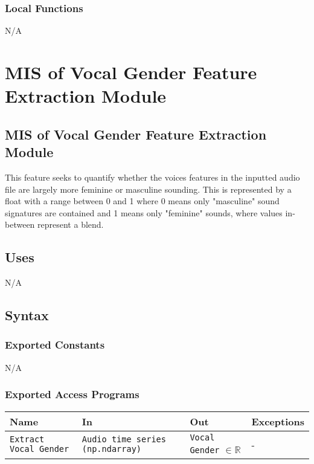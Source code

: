 \documentclass[12pt, titlepage]{article}
\begin{document}
\subsubsection{Local Functions}
N/A


\section{MIS of Vocal Gender Feature Extraction Module} 

\subsection{MIS of Vocal Gender Feature Extraction Module}
This feature seeks to quantify whether the voices features in the inputted audio file 
are largely more feminine or masculine sounding. This is represented by a float with a range between
0 and 1 where 0 means only "masculine" sound signatures are contained and 1 means only "feminine" sounds,
where values in-between represent a blend. 

\subsection{Uses}
N/A

\subsection{Syntax}

\subsubsection{Exported Constants}
N/A

\subsubsection{Exported Access Programs}

\begin{center}
\begin{tabular}{p{2cm} p{4cm} p{4cm} p{2cm}}
\hline
\textbf{Name} & \textbf{In} & \textbf{Out} & \textbf{Exceptions}\\
\hline%
\texttt{Extract Vocal Gender} &\texttt{Audio time series (np.ndarray)} &\texttt{Vocal Gender} $\in \mathbb{R}$ &-\\
\hline
\end{tabular}
\end{center}
\end{document}
